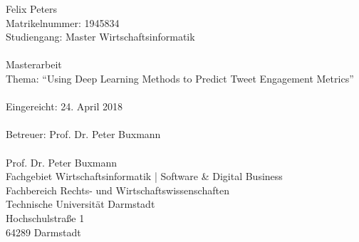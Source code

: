 %
%
%
%
\vspace*{\fill}
\singlespacing 
\noindent Felix Peters \\
Matrikelnummer: 1945834 \\
Studiengang: Master Wirtschaftsinformatik \\\\
Masterarbeit \\
Thema: ``Using Deep Learning Methods to Predict Tweet Engagement Metrics'' \\\\
Eingereicht: 24. April 2018 \\\\
Betreuer: Prof. Dr. Peter Buxmann \\\\
Prof. Dr. Peter Buxmann \\
Fachgebiet Wirtschaftsinformatik | Software \& Digital Business \\
Fachbereich Rechts- und Wirtschaftswissenschaften \\
Technische Universität Darmstadt \\
Hochschulstraße 1 \\
64289 Darmstadt \\

\onehalfspacing

\setcounter{page}{2}
